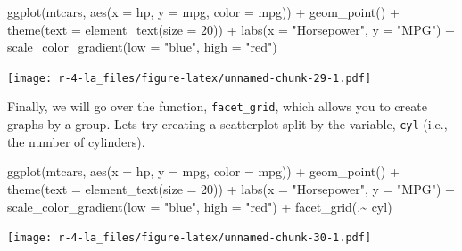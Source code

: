 \documentclass[
]{book}
\newenvironment{Shaded}{\begin{snugshade}}{\end{snugshade}}
\newcommand{\AttributeTok}[1]{\textcolor[rgb]{0.77,0.63,0.00}{#1}}
\newcommand{\DecValTok}[1]{\textcolor[rgb]{0.00,0.00,0.81}{#1}}
\newcommand{\FunctionTok}[1]{\textcolor[rgb]{0.00,0.00,0.00}{#1}}
\newcommand{\NormalTok}[1]{#1}
\newcommand{\SpecialCharTok}[1]{\textcolor[rgb]{0.00,0.00,0.00}{#1}}
\newcommand{\StringTok}[1]{\textcolor[rgb]{0.31,0.60,0.02}{#1}}
\begin{document}
\begin{Shaded}
\begin{Highlighting}[]
\FunctionTok{ggplot}\NormalTok{(mtcars, }\FunctionTok{aes}\NormalTok{(}\AttributeTok{x =}\NormalTok{ hp, }\AttributeTok{y =}\NormalTok{ mpg, }\AttributeTok{color =}\NormalTok{ mpg)) }\SpecialCharTok{+} 
      \FunctionTok{geom\_point}\NormalTok{() }\SpecialCharTok{+} 
      \FunctionTok{theme}\NormalTok{(}\AttributeTok{text =} \FunctionTok{element\_text}\NormalTok{(}\AttributeTok{size =} \DecValTok{20}\NormalTok{)) }\SpecialCharTok{+} 
      \FunctionTok{labs}\NormalTok{(}\AttributeTok{x =} \StringTok{"Horsepower"}\NormalTok{, }\AttributeTok{y =} \StringTok{"MPG"}\NormalTok{) }\SpecialCharTok{+} 
      \FunctionTok{scale\_color\_gradient}\NormalTok{(}\AttributeTok{low =} \StringTok{"blue"}\NormalTok{, }\AttributeTok{high =} \StringTok{"red"}\NormalTok{)}
\end{Highlighting}
\end{Shaded}

\texttt{[image: r-4-la\_files/figure-latex/unnamed-chunk-29-1.pdf]}

Finally, we will go over the function, \texttt{facet\_grid}, which allows you to create graphs by a group. Lets try creating a scatterplot split by the variable, \texttt{cyl} (i.e., the number of cylinders).

\begin{Shaded}
\begin{Highlighting}[]
\FunctionTok{ggplot}\NormalTok{(mtcars, }\FunctionTok{aes}\NormalTok{(}\AttributeTok{x =}\NormalTok{ hp, }\AttributeTok{y =}\NormalTok{ mpg, }\AttributeTok{color =}\NormalTok{ mpg)) }\SpecialCharTok{+} 
      \FunctionTok{geom\_point}\NormalTok{() }\SpecialCharTok{+} 
      \FunctionTok{theme}\NormalTok{(}\AttributeTok{text =} \FunctionTok{element\_text}\NormalTok{(}\AttributeTok{size =} \DecValTok{20}\NormalTok{)) }\SpecialCharTok{+} 
      \FunctionTok{labs}\NormalTok{(}\AttributeTok{x =} \StringTok{"Horsepower"}\NormalTok{, }\AttributeTok{y =} \StringTok{"MPG"}\NormalTok{) }\SpecialCharTok{+} 
      \FunctionTok{scale\_color\_gradient}\NormalTok{(}\AttributeTok{low =} \StringTok{"blue"}\NormalTok{, }\AttributeTok{high =} \StringTok{"red"}\NormalTok{) }\SpecialCharTok{+} 
      \FunctionTok{facet\_grid}\NormalTok{(.}\SpecialCharTok{\textasciitilde{}}\NormalTok{ cyl)}
\end{Highlighting}
\end{Shaded}

\texttt{[image: r-4-la\_files/figure-latex/unnamed-chunk-30-1.pdf]}
\end{document}
